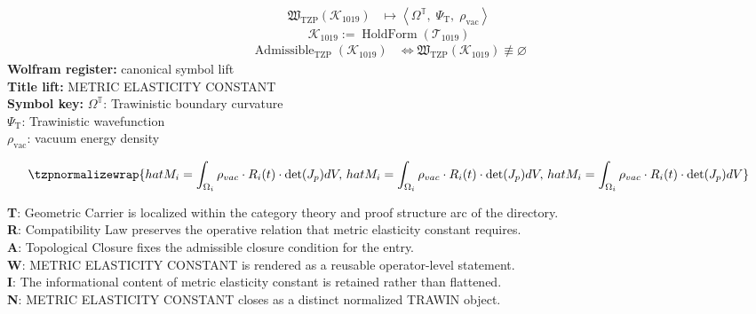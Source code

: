 \noindent
\begin{minipage}[t]{0.48\linewidth}
\begingroup
\small
\[
\begin{aligned}
\mathfrak{W}_{\mathrm{TZP}}\!\left(\mathcal{K}_{1019}\right)
&\longmapsto
\left\langle \Omega^{\mathbb{T}},\; \Psi_{\mathrm{T}},\; \rho_{\mathrm{vac}} \right\rangle
\end{aligned}
\]
\[
\mathcal{K}_{1019}
:=
\operatorname{HoldForm}\!\left(\mathcal{T}_{1019}\right)
\]
\[
\begin{aligned}
\operatorname{Admissible}_{\mathrm{TZP}}\!\left(\mathcal{K}_{1019}\right)
&\Longleftrightarrow
\mathfrak{W}_{\mathrm{TZP}}\!\left(\mathcal{K}_{1019}\right)\not\equiv\varnothing
\end{aligned}
\]
\textbf{Wolfram register:} canonical symbol lift\\
\textbf{Title lift:} METRIC ELASTICITY CONSTANT\\
\textbf{Symbol key:} \(\Omega^{\mathbb{T}}\): Trawinistic boundary curvature\\ \(\Psi_{\mathrm{T}}\): Trawinistic wavefunction\\ \(\rho_{\mathrm{vac}}\): vacuum energy density
\par
\endgroup
\end{minipage}\hfill
\begin{minipage}[t]{0.48\linewidth}
\[
\tzpnormalizewrap{hat{M}_i = \int_{\Omega_i} \rho_{vac} \cdot R_i(t) \cdot \det(J_p) dV,\,hat{M}_i = \int_{\Omega_i} \rho_{vac} \cdot R_i(t) \cdot \det(J_p) dV,\,hat{M}_i = \int_{\Omega_i} \rho_{vac} \cdot R_i(t) \cdot \det(J_p) dV}
\]

\small
\textbf{T}: Geometric Carrier is localized within the category theory and proof structure arc of the directory.\\
\textbf{R}: Compatibility Law preserves the operative relation that metric elasticity constant requires.\\
\textbf{A}: Topological Closure fixes the admissible closure condition for the entry.\\
\textbf{W}: METRIC ELASTICITY CONSTANT is rendered as a reusable operator-level statement.\\
\textbf{I}: The informational content of metric elasticity constant is retained rather than flattened.\\
\textbf{N}: METRIC ELASTICITY CONSTANT closes as a distinct normalized TRAWIN object.
\normalsize
\end{minipage}

